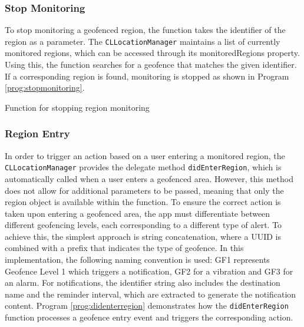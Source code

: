 \subsubsection{Stop Monitoring}
To stop monitoring a geofenced region, the function takes the identifier of the region as a parameter. 
The \lstinline{CLLocationManager} maintains a list of currently monitored regions, which can be accessed through its monitoredRegions property. 
Using this, the function searches for a geofence that matches the given identifier. 
If a corresponding region is found, monitoring is stopped as shown in Program \ref{prog:stopmonitoring}.

\begin{program}[htbp]
\caption{Function for stopping region monitoring}
\label{prog:stopmonitoring}
\end{program}

\subsubsection{Region Entry}
In order to trigger an action based on a user entering a monitored region, the \lstinline{CLLocationManager} provides the delegate method \lstinline{didEnterRegion}, which is automatically called when a user enters a geofenced area. 
However, this method does not allow for additional parameters to be passed, meaning that only the region object is available within the function.
To ensure the correct action is taken upon entering a geofenced area, the app must differentiate between different geofencing levels, each corresponding to a different type of alert. 
To achieve this, the simplest approach is string concatenation, where a \ac{UUID} is combined with a prefix that indicates the type of geofence. 
In this implementation, the following naming convention is used: GF1 represents Geofence Level 1 which triggers a notification, GF2 for a vibration and GF3 for an alarm.
For notifications, the identifier string also includes the destination name and the reminder interval, which are extracted to generate the notification content. 
Program \ref{prog:didenterregion} demonstrates how the \lstinline{didEnterRegion} function processes a geofence entry event and triggers the corresponding action.

